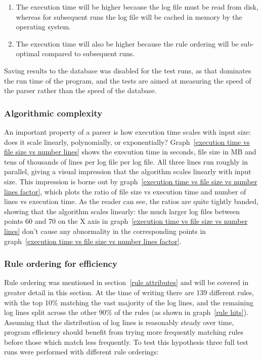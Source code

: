 \documentclass[a4paper,12pt,draft]{article}
\begin{document}
\begin{enumerate}

    \item The execution time will be higher because the log file must be
        read from disk, whereas for subsequent runs the log file will be
        cached in memory by the operating system.

    \item The execution time will also be higher because the rule ordering
        will be sub-optimal compared to subsequent runs.

\end{enumerate}

Saving results to the database was disabled for the test runs, as that
dominates the run time of the program, and the tests are aimed at measuring
the speed of the parser rather than the speed of the database.

\subsubsection{Algorithmic complexity}

An important property of a parser is how execution time scales with input
size: does it scale linearly, polynomially, or exponentially?
Graph~\ref{execution time vs file size vs number lines} shows the execution
time in seconds, file size in MB and tens of thousands of lines per log
file per log file.  All three lines run roughly in parallel, giving a
visual impression that the algorithm scales linearly with input size.  This
impression is borne out by graph~\ref{execution time vs file size vs number
lines factor}, which plots the ratio of file size vs execution time and
number of lines vs execution time.  As the reader can see, the ratios are
quite tightly banded, showing that the algorithm scales linearly: the much
larger log files between points 60 and 70 on the X axis in
graph~\ref{execution time vs file size vs number lines} don't cause any
abnormality in the corresponding points in graph~\ref{execution time vs
file size vs number lines factor}.


\subsubsection{Rule ordering for efficiency}

\label{rule ordering for efficiency}

Rule ordering was mentioned in section~\ref{rule attributes} and will be
covered in greater detail in this section.  At the time of writing there
are 139 different rules, with the top 10\% matching the vast majority of
the log lines, and the remaining log lines split across the other 90\% of
the rules (as shown in graph~\ref{rule hits}).  Assuming that the
distribution of log lines is reasonably steady over time, program
efficiency should benefit from trying more frequently matching rules before
those which match less frequently.  To test this hypothesis three full test
runs were performed with different rule orderings:
\end{document}
